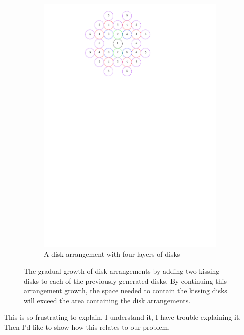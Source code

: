 \begin{figure}[h]
\begin{center}
\begin{subfigure}[b]{0.24\textwidth}
	  \includegraphics[width=\textwidth]{graphics/degree5arrangement.pdf}
	  \caption{A disk arrangement with four layers of disks}
	  \label{fig:circlePacking1-3}
  \end{subfigure}
\end{center} 
\caption{The gradual growth of disk arrangements by adding two kissing disks to each of the previously generated disks.  By continuing this arrangement growth, the space needed to contain the kissing disks will exceed the area containing the disk arrangements.}\label{fig:circlePacking-1}
\end{figure}
This is so frustrating to explain.  I understand it, I have trouble explaining it.  Then I'd like to show how this relates to our problem.